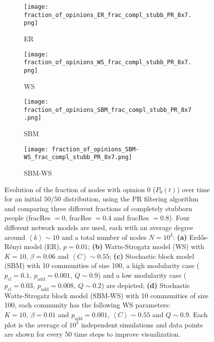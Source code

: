 \documentclass[11 pt , letterpaper , twoside , openright]{book}
\begin{document}
\begin{figure}[H]
  \begin{subfigure}[b]{0.49\textwidth}
  	\texttt{[image: fraction\_of\_opinions\_ER\_frac\_compl\_stubb\_PR\_8x7.png]}
    \caption{ER}
  \end{subfigure}
  \begin{subfigure}[b]{0.49\textwidth}
  	\texttt{[image: fraction\_of\_opinions\_WS\_frac\_compl\_stubb\_PR\_8x7.png]}
    \caption{WS}
  \end{subfigure}
  \begin{subfigure}[b]{0.49\textwidth}
    \texttt{[image: fraction\_of\_opinions\_SBM\_frac\_compl\_stubb\_PR\_8x7.png]}
    \caption{SBM}
  \end{subfigure}
  \begin{subfigure}[b]{0.49\textwidth}
    \texttt{[image: fraction\_of\_opinions\_SBM-WS\_frac\_compl\_stubb\_PR\_8x7.png]}
    \caption{SBM-WS}
  \end{subfigure}
  \captionsetup{format=plain}
  \caption[Evolution of the fraction of nodes with opinion 0 ($P_0(t)$) over time for an initial $50/50$ opinion distribution, using the PR filtering algorithm and comparing three different fractions of completely stubborn people (fracRes $= 0$, fracRes $= 0.4$ and fracRes $= 0.8$).]{Evolution of the fraction of nodes with opinion 0 ($P_0(t)$) over time for an initial $50/50$ distribution, using the PR filtering algorithm and comparing three different fractions of completely stubborn people (fracRes $= 0$, fracRes $= 0.4$ and fracRes $= 0.8$). Four different network models are used, each with an average degree around $\left<k\right> \sim 10$ and a total number of nodes $N = 10^3$: \textbf{(a)} Erd\H{o}s-R\'{e}nyi model (ER), $p=0.01$; \textbf{(b)} Watts-Strogatz model (WS) with $K = 10$, $\beta = 0.06$ and $\left<C\right> \sim 0.55$; \textbf{(c)} Stochastic block model (SBM) with 10 communities of size 100, a high modularity case ($p_{\text{cl}} = 0.1,\ p_{\text{add}} = 0.001,\ Q \sim 0.9$) and a low modularity case ($p_{\text{cl}} = 0.03,\ p_{\text{add}} = 0.008,\ Q \sim 0.2$) are depicted; \textbf{(d)} Stochastic Watts-Strogatz block model (SBM-WS) with 10 communities of size 100, each community has the following WS parameters: $K = 10,\ \beta = 0.01$ and $p_{\text{add}} = 0.001$, $\left<C\right> \sim 0.55$ and $Q \sim 0.9$. Each plot is the average of $10^2$ independent simulations and data points are shown for every 50 time steps to improve visualization.}%
\label{ev_op_50_50_stubb_PR}
\end{figure}
\end{document}
